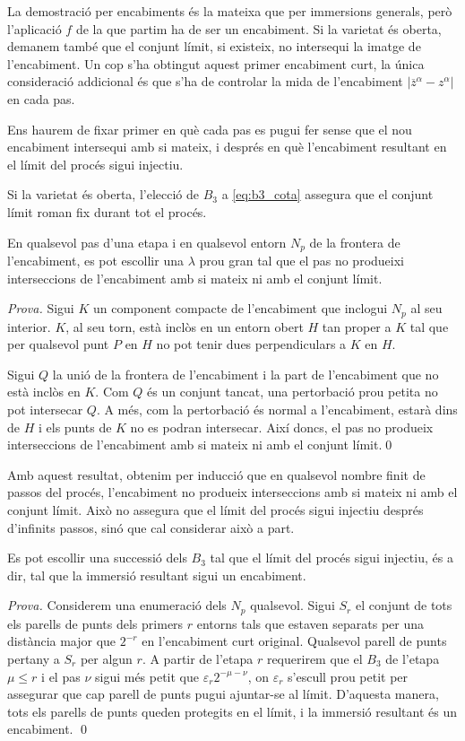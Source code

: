 La demostració per encabiments és la mateixa que per immersions generals, però l'aplicació $f$ de la que partim ha de ser un encabiment. Si la varietat és oberta, demanem també que el conjunt límit, si existeix, no intersequi la imatge de l'encabiment. Un cop s'ha obtingut aquest primer encabiment curt, la única consideració addicional és que s'ha de controlar la mida de l'encabiment $|\overline z^\alpha - z^\alpha|$ en cada pas.

Ens haurem de fixar primer en què cada pas es pugui fer sense que el nou encabiment intersequi amb si mateix, i després en què l'encabiment resultant en el límit del procés sigui injectiu.
\begin{obs}
    Si la varietat és oberta, l'elecció de $B_3$ a \eqref{eq:b3_cota} assegura que el conjunt límit roman fix durant tot el procés.
\end{obs}
\begin{prop}
    En qualsevol pas d'una etapa i en qualsevol entorn $N_p$ de la frontera de l'encabiment, es pot escollir una $\lambda$ prou gran tal que el pas no produeixi interseccions de l'encabiment amb si mateix ni amb el conjunt límit.
\end{prop}
{
\color{black} \textit{Prova.} 
    Sigui $K$ un component compacte de l'encabiment que inclogui $N_p$ al seu interior. $K$, al seu torn, està inclòs en un entorn obert $H$ tan proper a $K$ tal que per qualsevol punt $P$ en $H$ no pot tenir dues perpendiculars a $K$ en $H$.

    Sigui $Q$ la unió de la frontera de l'encabiment i la part de l'encabiment que no està inclòs en $K$. Com $Q$ és un conjunt tancat, una pertorbació prou petita no pot intersecar $Q$. A més, com la pertorbació és normal a l'encabiment, estarà dins de $H$ i els punts de $K$ no es podran intersecar. Així doncs, el pas no produeix interseccions de l'encabiment amb si mateix ni amb el conjunt límit.\qed
}

Amb aquest resultat, obtenim per inducció que en qualsevol nombre finit de passos del procés, l'encabiment no produeix interseccions amb si mateix ni amb el conjunt límit. Això no assegura que el límit del procés sigui injectiu després d'infinits passos, sinó que cal considerar això a part.

\begin{prop}
    Es pot escollir una successió dels $B_3$ tal que el límit del procés sigui injectiu, és a dir, tal que la immersió resultant sigui un encabiment.
\end{prop}
{
\color{black} \textit{Prova.} 
    Considerem una enumeració dels $N_p$ qualsevol. Sigui $S_r$ el conjunt de tots els parells de punts dels primers $r$ entorns tals que estaven separats per una distància major que $2^{-r}$ en l'encabiment curt original. Qualsevol parell de punts pertany a $S_r$ per algun $r$. A partir de l'etapa $r$ requerirem que el $B_3$ de l'etapa $\mu\le r$ i el pas $\nu$ sigui més petit que $\varepsilon_r2^{-\mu-\nu}$, on $\varepsilon_r$ s'escull prou petit per assegurar que cap parell de punts pugui ajuntar-se al límit. D'aquesta manera, tots els parells de punts queden protegits en el límit, i la immersió resultant és un encabiment. \qed
}

